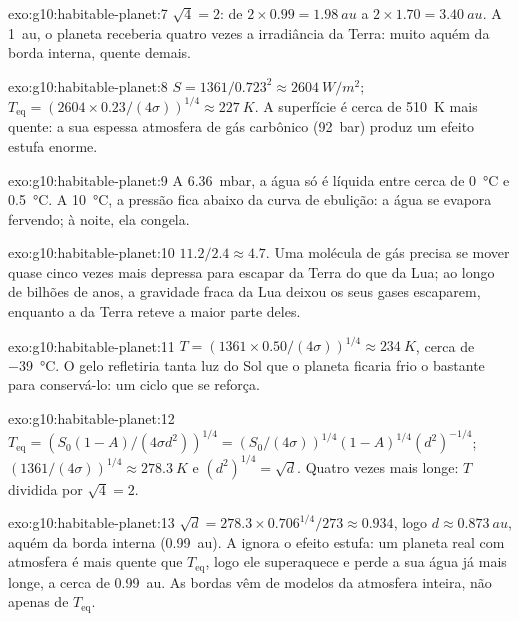 \begin{solution}{exo:g10:habitable-planet:7}
$\sqrt 4 = 2$: de $2 \times 0.99 = \qty{1.98}{au}$ a $2 \times 1.70 =
\qty{3.40}{au}$. A \qty{1}{au}, o planeta receberia quatro vezes a
irradiância da Terra: muito aquém da borda interna, quente demais.
\end{solution}

\begin{solution}{exo:g10:habitable-planet:8}
$S = 1361/0.723^2 \approx \qty{2604}{W/m^2}$;
$T_{\mathrm{eq}} = (2604 \times 0.23/(4\sigma))^{1/4} \approx \qty{227}{K}$.
A superfície é cerca de \qty{510}{K} mais quente: a sua espessa atmosfera de
gás carbônico (\qty{92}{bar}) produz um efeito estufa enorme.
\end{solution}

\begin{solution}{exo:g10:habitable-planet:9}
A \qty{6.36}{mbar}, a água só é líquida entre cerca de
\qty{0}{\degreeCelsius} e \qty{0.5}{\degreeCelsius}. A
\qty{10}{\degreeCelsius}, a pressão fica abaixo da curva de ebulição: a
água se evapora fervendo; à noite, ela congela.
\end{solution}

\begin{solution}{exo:g10:habitable-planet:10}
$11.2/2.4 \approx 4.7$. Uma molécula de gás precisa se mover quase cinco
vezes mais depressa para escapar da Terra do que da Lua; ao longo de bilhões
de anos, a gravidade fraca da Lua deixou os seus gases escaparem, enquanto a
da Terra reteve a maior parte deles.
\end{solution}

\begin{solution}{exo:g10:habitable-planet:11}
$T = (1361 \times 0.50/(4\sigma))^{1/4} \approx \qty{234}{K}$, cerca de
\qty{-39}{\degreeCelsius}. O gelo refletiria tanta luz do Sol que o planeta
ficaria frio o bastante para conservá-lo: um ciclo que se reforça.
\end{solution}

\begin{solution}{exo:g10:habitable-planet:12}
$T_{\mathrm{eq}} = (S_0(1-A)/(4\sigma d^2))^{1/4} = (S_0/(4\sigma))^{1/4}
(1-A)^{1/4} (d^2)^{-1/4}$; $(1361/(4\sigma))^{1/4} \approx \qty{278.3}{K}$ e
$(d^2)^{1/4} = \sqrt d$. Quatro vezes mais longe: $T$ dividida por $\sqrt 4 = 2$.
\end{solution}

\begin{solution}{exo:g10:habitable-planet:13}
$\sqrt d = 278.3 \times 0.706^{1/4}/273 \approx 0.934$, logo $d \approx
\qty{0.873}{au}$, aquém da borda interna (\qty{0.99}{au}). A  ignora o efeito estufa: um planeta real com atmosfera é mais
quente que $T_{\mathrm{eq}}$, logo ele superaquece e perde a sua água já
mais longe, a cerca de \qty{0.99}{au}. As bordas vêm de modelos da
atmosfera inteira, não apenas de $T_{\mathrm{eq}}$.
\end{solution}

